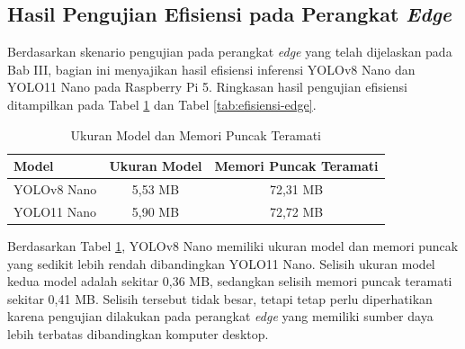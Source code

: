 \begin{sectioncontent}
    \subsection{Hasil Pengujian Efisiensi pada Perangkat \textit{Edge}}
    \begin{subsectioncontent}
        \hspace{\parindent}Berdasarkan skenario pengujian pada perangkat \textit{edge} yang telah dijelaskan pada Bab III, bagian ini menyajikan hasil efisiensi inferensi YOLOv8 Nano dan YOLO11 Nano pada Raspberry Pi 5. Ringkasan hasil pengujian efisiensi ditampilkan pada Tabel \ref{tab:ukuran-model-memori} dan Tabel \ref{tab:efisiensi-edge}.

        \begin{table}[H]
            \centering
            \caption{Ukuran Model dan Memori Puncak Teramati}
            \label{tab:ukuran-model-memori}
            \begin{tabular}{|l|c|c|}
                \hline
                \textbf{Model} & \textbf{Ukuran Model} & \textbf{Memori Puncak Teramati} \\
                \hline
                YOLOv8 Nano & 5,53 MB & 72,31 MB \\
                \hline
                YOLO11 Nano & 5,90 MB & 72,72 MB \\
                \hline
            \end{tabular}
        \end{table}

        Berdasarkan Tabel \ref{tab:ukuran-model-memori}, YOLOv8 Nano memiliki ukuran model dan memori puncak yang sedikit lebih rendah dibandingkan YOLO11 Nano. Selisih ukuran model kedua model adalah sekitar 0,36 MB, sedangkan selisih memori puncak teramati sekitar 0,41 MB. Selisih tersebut tidak besar, tetapi tetap perlu diperhatikan karena pengujian dilakukan pada perangkat \textit{edge} yang memiliki sumber daya lebih terbatas dibandingkan komputer desktop.


\end{subsectioncontent}
\end{sectioncontent}
